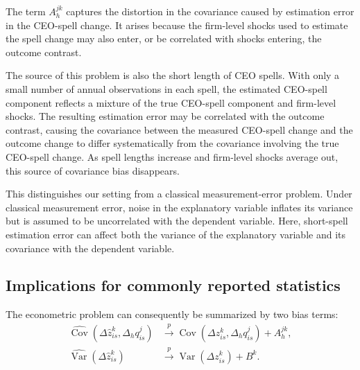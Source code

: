 \documentclass[11pt,a4paper]{article}
\begin{document}
The term $A_h^{jk}$ captures the distortion in the covariance caused
by estimation error in the CEO-spell change. It arises because the
firm-level shocks used to estimate the spell change may also enter, or
be correlated with shocks entering, the outcome contrast. 

The source of this problem is also the short length of CEO spells. With only a small number of annual observations in each spell, the estimated CEO-spell component reflects a mixture of the true CEO-spell component and firm-level shocks. The resulting estimation error may be correlated with the outcome contrast, causing the covariance between the measured CEO-spell change and the outcome change to differ systematically from the covariance involving the true CEO-spell change. As spell lengths increase and firm-level shocks average out, this source of covariance bias disappears.

This distinguishes our setting from a classical measurement-error
problem. Under classical measurement error, noise in the explanatory
variable inflates its variance but is assumed to be uncorrelated with
the dependent variable. Here, short-spell estimation error can affect
both the variance of the explanatory variable and its covariance with
the dependent variable.

\subsection{Implications for commonly reported statistics}\label{subsec:implications}


The econometric problem can consequently be summarized by two bias
terms:
\begin{align}
\widehat{\operatorname{Cov}}\!\left(
\Delta\widehat z_{is}^{k},
\Delta_h q_{is}^{j}
\right)
&\overset{p}{\longrightarrow}
\operatorname{Cov}\!\left(
\Delta z_{is}^{k},
\Delta_h q_{is}^{j}
\right)
+
A_h^{jk},
\nonumber\\[4pt]
\widehat{\operatorname{Var}}\!\left(
\Delta\widehat z_{is}^{k}
\right)
&\overset{p}{\longrightarrow}
\operatorname{Var}\!\left(
\Delta z_{is}^{k}
\right)
+
B^{k}.
\label{eq:bias_summary}
\end{align}
\end{document}
